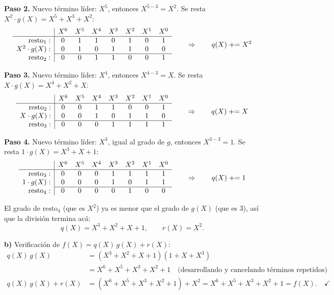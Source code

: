 \documentclass[11pt]{article}
\newcommand{\ok}{\checkmark}
\begin{document}
\textbf{Paso 2.} Nuevo término líder: $X^5$, entonces $X^{5-3}=X^2$. Se resta
$X^2\cdot g(X)=X^5+X^3+X^2$:
$$
\begin{array}{r|c c c c c c c}
 & X^6 & X^5 & X^4 & X^3 & X^2 & X^1 & X^0 \\
\hline
\text{resto}_1: & 0 & 1 & 1 & 0 & 1 & 0 & 1 \\
X^2\cdot g(X): & 0 & 1 & 0 & 1 & 1 & 0 & 0 \\
\cline{2-8}
\text{resto}_2: & 0 & 0 & 1 & 1 & 0 & 0 & 1 \\
\end{array}
\qquad\Rightarrow\qquad q(X)\mathrel{+}=X^2
$$
 
\textbf{Paso 3.} Nuevo término líder: $X^4$, entonces $X^{4-3}=X$. Se resta
$X\cdot g(X)=X^4+X^2+X$:
$$
\begin{array}{r|c c c c c c c}
 & X^6 & X^5 & X^4 & X^3 & X^2 & X^1 & X^0 \\
\hline
\text{resto}_2: & 0 & 0 & 1 & 1 & 0 & 0 & 1 \\
X\cdot g(X): & 0 & 0 & 1 & 0 & 1 & 1 & 0 \\
\cline{2-8}
\text{resto}_3: & 0 & 0 & 0 & 1 & 1 & 1 & 1 \\
\end{array}
\qquad\Rightarrow\qquad q(X)\mathrel{+}=X
$$
 
\textbf{Paso 4.} Nuevo término líder: $X^3$, igual al grado de $g$, entonces $X^{3-3}=1$.
Se resta $1\cdot g(X)=X^3+X+1$:
$$
\begin{array}{r|c c c c c c c}
 & X^6 & X^5 & X^4 & X^3 & X^2 & X^1 & X^0 \\
\hline
\text{resto}_3: & 0 & 0 & 0 & 1 & 1 & 1 & 1 \\
1\cdot g(X): & 0 & 0 & 0 & 1 & 0 & 1 & 1 \\
\cline{2-8}
\text{resto}_4: & 0 & 0 & 0 & 0 & 1 & 0 & 0 \\
\end{array}
\qquad\Rightarrow\qquad q(X)\mathrel{+}=1
$$
 
El grado de $\text{resto}_4$ (que es $X^2$) ya es menor que el grado de $g(X)$ (que es 3), así
que la división termina acá:
$$q(X) = X^3+X^2+X+1, \qquad r(X) = X^2.$$
 
\textbf{b)} Verificación de $f(X) = q(X)\,g(X) + r(X)$:
\begin{align*}
q(X)\,g(X) &= (X^3+X^2+X+1)(1+X+X^3) \\
&= X^6+X^5+X^3+X^2+1 \quad\text{(desarrollando y cancelando términos repetidos)} \\
q(X)\,g(X)+r(X) &= (X^6+X^5+X^3+X^2+1) + X^2 = X^6+X^5+X^3+X^2+1 = f(X). \quad \ok
\end{align*}
\end{document}
